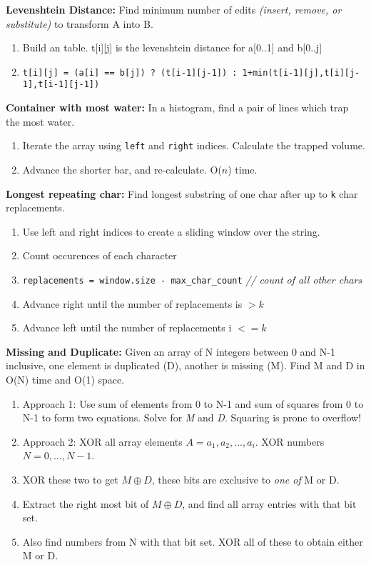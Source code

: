 \documentclass[12pt]{article}
\newcommand{\ON}{O($n$) }
\begin{document}
\vspace{5mm}
\noindent
\textbf{Levenshtein Distance:}
Find minimum number of edits \emph{(insert, remove, or substitute)} to transform A into B.
\begin{enumerate}
\item Build an table. t[i][j] is the levenshtein distance for a[0..1] and b[0..j]
\item \texttt{t[i][j] = (a[i] == b[j]) ? (t[i-1][j-1]) : 1+min(t[i-1][j],t[i][j-1],t[i-1][j-1])}
\end{enumerate}


\vspace{5mm}
\noindent
\textbf{Container with most water:}
In a histogram, find a pair of lines which trap the most water.
\begin{enumerate}
\item Iterate the array using \texttt{left} and \texttt{right} indices. Calculate the trapped volume.
\item Advance the shorter bar, and re-calculate. \ON time.
\end{enumerate}
\vspace{5mm}


\vspace{5mm}
\noindent
\textbf{Longest repeating char:}
Find longest substring of one char after up to \texttt{k} char replacements.
\begin{enumerate}
\item Use left and right indices to create a sliding window over the string.
\item Count occurences of each character
\item \texttt{replacements = window.size - max\_char\_count} \emph{// count of all other chars}
\item Advance right until the number of replacements is $> k$
\item Advance left until the number of replacements i $<= k$
\end{enumerate}
\vspace{5mm}


\noindent
\textbf{Missing and Duplicate:}
Given an array of N integers between 0 and N-1 inclusive, one element is duplicated (D),
another is missing (M). Find M and D in O(N) time and O(1) space.
\begin{enumerate}
\item Approach 1: Use sum of elements from 0 to N-1 and sum of squares from 0 to N-1 to form two equations. Solve for \emph{M} and \emph{D}. Squaring is prone to overflow! 
\item Approach 2: XOR all array elements $A = {a_1, a_2, ..., a_i}$. XOR numbers $N = {0,...,N-1}$. 
\item XOR these two to get $M \oplus D$, these bits are exclusive to \emph{one of} M or D.
\item Extract the right most bit of $M \oplus D$, and find all array entries with that bit set.
\item Also find numbers from N with that bit set. XOR all of these to obtain either M or D. 
\end{enumerate}
\end{document}
